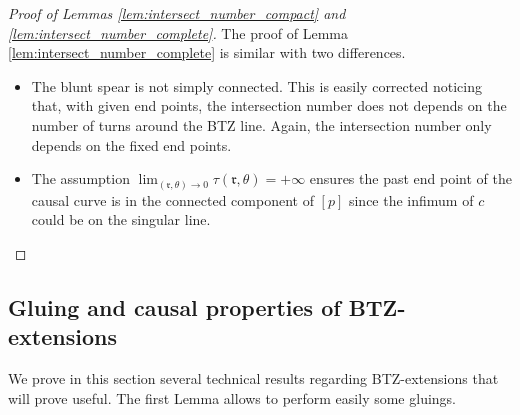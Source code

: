 \documentclass[a4paper,12pt]{article}
\def\r{\mathfrak{r}}
\begin{document}
\begin{proof}[Proof of Lemmas \ref{lem:intersect_number_compact} and \ref{lem:intersect_number_complete}]
      The proof of Lemma \ref{lem:intersect_number_complete} is similar with two differences.
      \begin{itemize}
       \item The blunt spear is not simply connected. This is easily corrected noticing  that, with given end points, the intersection number does not depends on the number of turns around the BTZ line. Again, the intersection number only depends on the fixed end points.
       \item The assumption $\lim_{(\r,\theta)\rightarrow 0}\tau(\r,\theta)=+\infty$ ensures the past end point of the causal curve  is in the connected component of $[p]$ since  the infimum of $c$  could be on the singular line.
      \end{itemize}

    
    \end{proof}
    
    
\subsection{Gluing and causal properties of BTZ-extensions}
\label{sec:gluing}
We prove in this section several technical results regarding BTZ-extensions that will prove useful. The first Lemma allows to perform easily some gluings.
\end{document}
